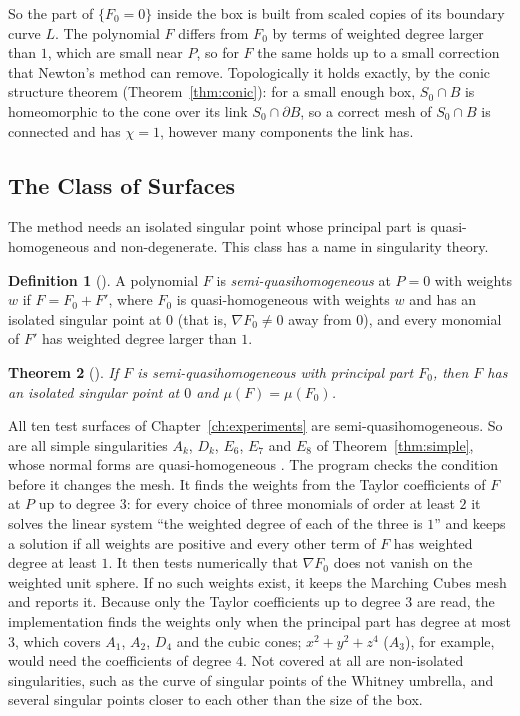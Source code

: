 \documentclass[12pt, a4paper, oneside]{book}
\theoremstyle{plain}
\newtheorem{theorem}{Theorem}[chapter]
\theoremstyle{definition}
\newtheorem{definition}[theorem]{Definition}
\theoremstyle{remark}
\theoremstyle{definition}
\begin{document}
So the part of $\{F_0=0\}$ inside the box is built from scaled copies of its boundary curve $L$. The polynomial $F$ differs from $F_0$ by terms of weighted degree larger than $1$, which are small near $P$, so for $F$ the same holds up to a small correction that Newton's method can remove. Topologically it holds exactly, by the conic structure theorem (Theorem~\ref{thm:conic}): for a small enough box, $S_0\cap B$ is homeomorphic to the cone over its link $S_0\cap\partial B$, so a correct mesh of $S_0\cap B$ is connected and has $\chi=1$, however many components the link has.

\subsection{The Class of Surfaces}
\label{sec:sqh}

The method needs an isolated singular point whose principal part is quasi-homogeneous and non-degenerate. This class has a name in singularity theory.

\begin{definition}[\cite{arnold1985singularities}]
\label{def:sqh}
A polynomial $F$ is \emph{semi-quasihomogeneous} at $P=0$ with weights $w$ if $F=F_0+F'$, where $F_0$ is quasi-homogeneous with weights $w$ and has an isolated singular point at $0$ (that is, $\nabla F_0\neq0$ away from $0$), and every monomial of $F'$ has weighted degree larger than $1$.
\end{definition}

\begin{theorem}[\cite{arnold1985singularities}]
\label{thm:sqh}
If $F$ is semi-quasihomogeneous with principal part $F_0$, then $F$ has an isolated singular point at $0$ and $\mu(F)=\mu(F_0)$.
\end{theorem}

All ten test surfaces of Chapter~\ref{ch:experiments} are semi-quasihomogeneous. So are all simple singularities $A_k$, $D_k$, $E_6$, $E_7$ and $E_8$ of Theorem~\ref{thm:simple}, whose normal forms are quasi-homogeneous \cite{arnold1985singularities}. The program checks the condition before it changes the mesh. It finds the weights from the Taylor coefficients of $F$ at $P$ up to degree $3$: for every choice of three monomials of order at least $2$ it solves the linear system ``the weighted degree of each of the three is $1$'' and keeps a solution if all weights are positive and every other term of $F$ has weighted degree at least $1$. It then tests numerically that $\nabla F_0$ does not vanish on the weighted unit sphere. If no such weights exist, it keeps the Marching Cubes mesh and reports it. Because only the Taylor coefficients up to degree $3$ are read, the implementation finds the weights only when the principal part has degree at most $3$, which covers $A_1$, $A_2$, $D_4$ and the cubic cones; $x^2+y^2+z^4$ ($A_3$), for example, would need the coefficients of degree $4$. Not covered at all are non-isolated singularities, such as the curve of singular points of the Whitney umbrella, and several singular points closer to each other than the size of the box.
\end{document}
